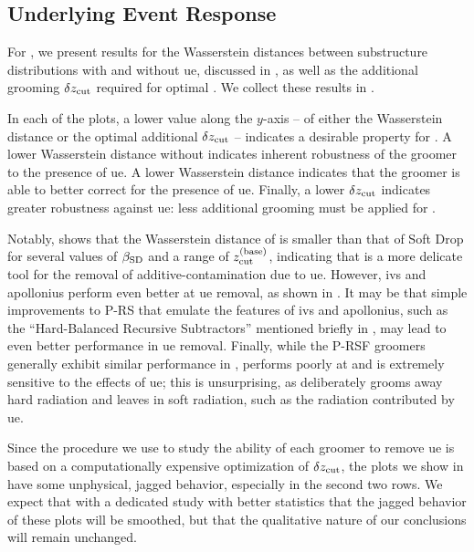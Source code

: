 \begin{subappendices}
\subsection{Underlying Event Response}
\label{app:uefrenzy}

For , we present results for the Wasserstein distances between substructure distributions with and without \gls{ue}, discussed in , as well as the additional grooming \(\delta z_{\rm cut}\) required for optimal .
%
We collect these results in .

In each of the plots, a lower value along the $y$-axis -- of either the Wasserstein distance or the optimal additional \(\delta z_{\rm cut}\) -- indicates a desirable property for .
%
A lower Wasserstein distance without  indicates inherent robustness of the groomer to the presence of \gls{ue}.
%
A lower  Wasserstein distance indicates that the groomer is able to better correct for the presence of \gls{ue}.
%
Finally, a lower \(\delta z_{\rm cut}\) indicates greater robustness against \gls{ue}:
%
less additional grooming must be applied for .

Notably,  shows that the  Wasserstein distance of  is smaller than that of Soft Drop for several values of \(\beta_{\rm SD}\) and a range of \(z_{\rm cut}^{\rm (base)}\), indicating that  is a more delicate tool for the removal of \gls{additive-contamination} due to \gls{ue}.
%
However, \gls{ivs} and \gls{apollonius} perform even better at \gls{ue} removal, as shown in .
%
It may be that simple improvements to P-RS that emulate the features of \gls{ivs} and \gls{apollonius}, such as the ``Hard-Balanced Recursive Subtractors'' mentioned briefly in , may lead to even better performance in \gls{ue} removal.
%
Finally, while the P-RSF groomers generally exhibit similar performance in ,  performs poorly at  and is extremely sensitive to the effects of \gls{ue};
%
this is unsurprising, as  deliberately grooms away hard radiation and leaves in soft radiation, such as the radiation contributed by \gls{ue}.

Since the procedure we use to study the ability of each groomer to remove \gls{ue} is based on a computationally expensive optimization of \(\delta z_{\rm cut}\), the plots we show in  have some unphysical, jagged behavior, especially in the second two rows.
%
We expect that with a dedicated study with better statistics that the jagged behavior of these plots will be smoothed, but that the qualitative nature of our conclusions will remain unchanged.


\end{subappendices}


